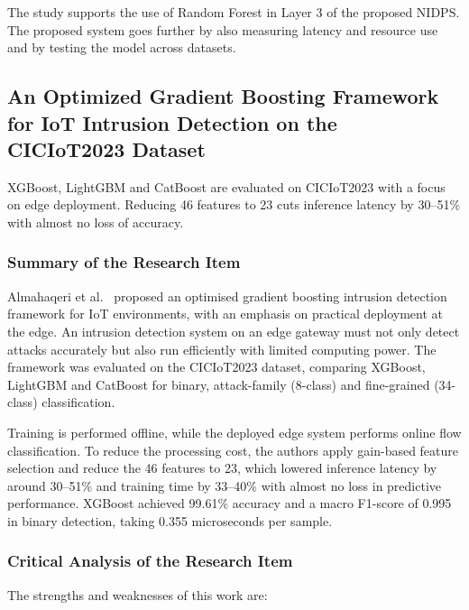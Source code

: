 \noindent The study supports the use of Random Forest in Layer 3 of the proposed NIDPS. The proposed system goes further by also measuring latency and resource use and by testing the model across datasets.

\subsection{An Optimized Gradient Boosting Framework for IoT Intrusion Detection on the CICIoT2023 Dataset}\label{sec:3.2.14}

\noindent XGBoost, LightGBM and CatBoost are evaluated on CICIoT2023 with a focus on edge deployment. Reducing 46 features to 23 cuts inference latency by 30--51\% with almost no loss of accuracy.

\subsubsection{Summary of the Research Item}\label{sec:3.2.14.1}

\noindent Almahaqeri et al.~\cite{lr:almahaqeri2026} proposed an optimised gradient boosting intrusion detection framework for IoT environments, with an emphasis on practical deployment at the edge. An intrusion detection system on an edge gateway must not only detect attacks accurately but also run efficiently with limited computing power. The framework was evaluated on the CICIoT2023 dataset, comparing XGBoost, LightGBM and CatBoost for binary, attack-family (8-class) and fine-grained (34-class) classification.

\noindent Training is performed offline, while the deployed edge system performs online flow classification. To reduce the processing cost, the authors apply gain-based feature selection and reduce the 46 features to 23, which lowered inference latency by around 30--51\% and training time by 33--40\% with almost no loss in predictive performance. XGBoost achieved 99.61\% accuracy and a macro F1-score of 0.995 in binary detection, taking 0.355 microseconds per sample.

\subsubsection{Critical Analysis of the Research Item}\label{sec:3.2.14.2}

\noindent The strengths and weaknesses of this work are:

